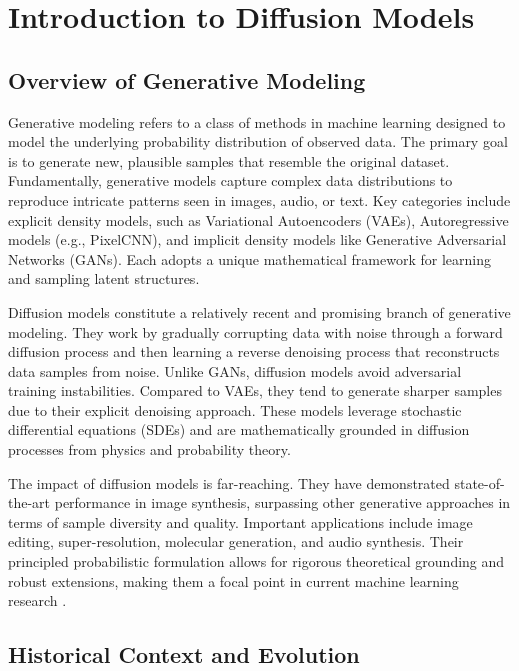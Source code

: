 \chapter{Introduction to Diffusion Models}

\section{Overview of Generative Modeling}

Generative modeling refers to a class of methods in machine learning designed to model the underlying probability distribution of observed data. The primary goal is to generate new, plausible samples that resemble the original dataset. Fundamentally, generative models capture complex data distributions to reproduce intricate patterns seen in images, audio, or text. Key categories include explicit density models, such as Variational Autoencoders (VAEs), Autoregressive models (e.g., PixelCNN), and implicit density models like Generative Adversarial Networks (GANs). Each adopts a unique mathematical framework for learning and sampling latent structures.

Diffusion models constitute a relatively recent and promising branch of generative modeling. They work by gradually corrupting data with noise through a forward diffusion process and then learning a reverse denoising process that reconstructs data samples from noise. Unlike GANs, diffusion models avoid adversarial training instabilities. Compared to VAEs, they tend to generate sharper samples due to their explicit denoising approach. These models leverage stochastic differential equations (SDEs) and are mathematically grounded in diffusion processes from physics and probability theory.

The impact of diffusion models is far-reaching. They have demonstrated state-of-the-art performance in image synthesis, surpassing other generative approaches in terms of sample diversity and quality. Important applications include image editing, super-resolution, molecular generation, and audio synthesis. Their principled probabilistic formulation allows for rigorous theoretical grounding and robust extensions, making them a focal point in current machine learning research \cite{Song2021}.

\section{Historical Context and Evolution}

